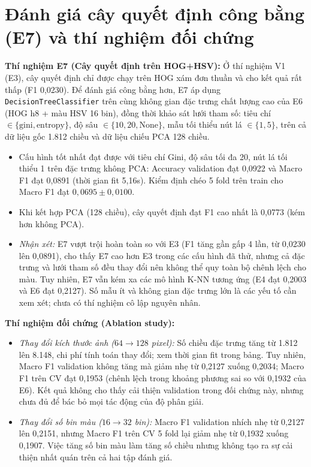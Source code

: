 \section{Đánh giá cây quyết định công bằng (E7) và thí nghiệm đối chứng}
\textbf{Thí nghiệm E7 (Cây quyết định trên HOG+HSV):} Ở thí nghiệm V1 (E3), cây quyết định chỉ được chạy trên HOG xám đơn thuần và cho kết quả rất thấp (F1 0,0230). Để đánh giá công bằng hơn, E7 áp dụng \texttt{DecisionTreeClassifier} trên cùng không gian đặc trưng chất lượng cao của E6 (HOG h8 + màu HSV 16 bin), đồng thời khảo sát lưới tham số: tiêu chí $\in \{\text{gini}, \text{entropy}\}$, độ sâu $\in \{10, 20, \text{None}\}$, mẫu tối thiểu nút lá $\in \{1, 5\}$, trên cả dữ liệu gốc 1.812 chiều và dữ liệu chiếu PCA 128 chiều.
\begin{itemize}
    \item Cấu hình tốt nhất đạt được với tiêu chí Gini, độ sâu tối đa 20, nút lá tối thiểu 1 trên đặc trưng không PCA: Accuracy validation đạt 0,0922 và Macro F1 đạt 0,0891 (thời gian fit 5,16s). Kiểm định chéo 5 fold trên train cho Macro F1 đạt $0,0695 \pm 0,0100$.
    \item Khi kết hợp PCA (128 chiều), cây quyết định đạt F1 cao nhất là 0,0773 (kém hơn không PCA).
    \item \textit{Nhận xét: } E7 vượt trội hoàn toàn so với E3 (F1 tăng gần gấp 4 lần, từ 0,0230 lên 0,0891), cho thấy E7 cao hơn E3 trong các cấu hình đã thử, nhưng cả đặc trưng và lưới tham số đều thay đổi nên không thể quy toàn bộ chênh lệch cho màu. Tuy nhiên, E7 vẫn kém xa các mô hình K-NN tương ứng (E4 đạt 0,2003 và E6 đạt 0,2127). Số mẫu ít và không gian đặc trưng lớn là các yếu tố cần xem xét; chưa có thí nghiệm cô lập nguyên nhân.
\end{itemize}

\textbf{Thí nghiệm đối chứng (Ablation study):}
\begin{itemize}
    \item \textit{Thay đổi kích thước ảnh ($64 \to 128$ pixel): } Số chiều đặc trưng tăng từ 1.812 lên 8.148, chi phí tính toán thay đổi; xem thời gian fit trong bảng. Tuy nhiên, Macro F1 validation không tăng mà giảm nhẹ từ 0,2127 xuống 0,2034; Macro F1 trên CV đạt 0,1953 (chênh lệch trong khoảng phương sai so với 0,1932 của E6). Kết quả không cho thấy cải thiện validation trong đối chứng này, nhưng chưa đủ để bác bỏ mọi tác động của độ phân giải.
    \item \textit{Thay đổi số bin màu ($16 \to 32$ bin): } Macro F1 validation nhích nhẹ từ 0,2127 lên 0,2151, nhưng Macro F1 trên CV 5 fold lại giảm nhẹ từ 0,1932 xuống 0,1907. Việc tăng số bin màu làm tăng số chiều nhưng không tạo ra sự cải thiện nhất quán trên cả hai tập đánh giá.
\end{itemize}

